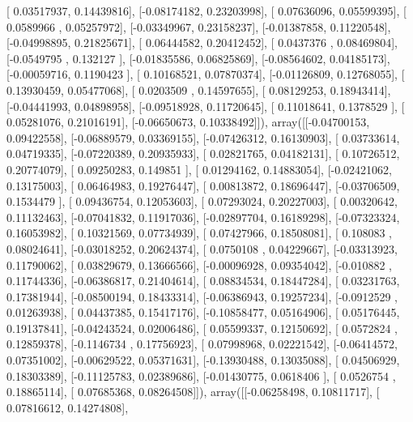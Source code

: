 \documentclass{article}
\begin{document}
       [ 0.03517937,  0.14439816],
       [-0.08174182,  0.23203998],
       [ 0.07636096,  0.05599395],
       [ 0.0589966 ,  0.05257972],
       [-0.03349967,  0.23158237],
       [-0.01387858,  0.11220548],
       [-0.04998895,  0.21825671],
       [ 0.06444582,  0.20412452],
       [ 0.0437376 ,  0.08469804],
       [-0.0549795 ,  0.132127  ],
       [-0.01835586,  0.06825869],
       [-0.08564602,  0.04185173],
       [-0.00059716,  0.1190423 ],
       [ 0.10168521,  0.07870374],
       [-0.01126809,  0.12768055],
       [ 0.13930459,  0.05477068],
       [ 0.0203509 ,  0.14597655],
       [ 0.08129253,  0.18943414],
       [-0.04441993,  0.04898958],
       [-0.09518928,  0.11720645],
       [ 0.11018641,  0.1378529 ],
       [ 0.05281076,  0.21016191],
       [-0.06650673,  0.10338492]]), array([[-0.04700153,  0.09422558],
       [-0.06889579,  0.03369155],
       [-0.07426312,  0.16130903],
       [ 0.03733614,  0.04719335],
       [-0.07220389,  0.20935933],
       [ 0.02821765,  0.04182131],
       [ 0.10726512,  0.20774079],
       [ 0.09250283,  0.149851  ],
       [ 0.01294162,  0.14883054],
       [-0.02421062,  0.13175003],
       [ 0.06464983,  0.19276447],
       [ 0.00813872,  0.18696447],
       [-0.03706509,  0.1534479 ],
       [ 0.09436754,  0.12053603],
       [ 0.07293024,  0.20227003],
       [ 0.00320642,  0.11132463],
       [-0.07041832,  0.11917036],
       [-0.02897704,  0.16189298],
       [-0.07323324,  0.16053982],
       [ 0.10321569,  0.07734939],
       [ 0.07427966,  0.18508081],
       [ 0.108083  ,  0.08024641],
       [-0.03018252,  0.20624374],
       [ 0.0750108 ,  0.04229667],
       [-0.03313923,  0.11790062],
       [ 0.03829679,  0.13666566],
       [-0.00096928,  0.09354042],
       [-0.010882  ,  0.11744336],
       [-0.06386817,  0.21404614],
       [ 0.08834534,  0.18447284],
       [ 0.03231763,  0.17381944],
       [-0.08500194,  0.18433314],
       [-0.06386943,  0.19257234],
       [-0.0912529 ,  0.01263938],
       [ 0.04437385,  0.15417176],
       [-0.10858477,  0.05164906],
       [ 0.05176445,  0.19137841],
       [-0.04243524,  0.02006486],
       [ 0.05599337,  0.12150692],
       [ 0.0572824 ,  0.12859378],
       [-0.1146734 ,  0.17756923],
       [ 0.07998968,  0.02221542],
       [-0.06414572,  0.07351002],
       [-0.00629522,  0.05371631],
       [-0.13930488,  0.13035088],
       [ 0.04506929,  0.18303389],
       [-0.11125783,  0.02389686],
       [-0.01430775,  0.0618406 ],
       [ 0.0526754 ,  0.18865114],
       [ 0.07685368,  0.08264508]]), array([[-0.06258498,  0.10811717],
       [ 0.07816612,  0.14274808],
\end{document}
